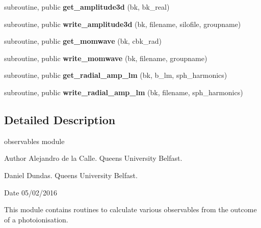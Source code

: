 \begin{DoxyCompactItemize}
\mbox{\label{namespaceobservables_a4898af9bd28d97f07c4bda50b9975368}} 
subroutine, public {\bfseries get\+\_\+amplitude3d} (bk, bk\+\_\+real)
\item 
\mbox{\label{namespaceobservables_a7cf9e4039abeb86fbdcdc0accdb0c5f8}} 
subroutine, public {\bfseries write\+\_\+amplitude3d} (bk, filename, silofile, groupname)
\item 
\mbox{\label{namespaceobservables_a618ee95c37379a52aa20abbabcc0b582}} 
subroutine, public {\bfseries get\+\_\+momwave} (bk, cbk\+\_\+rad)
\item 
\mbox{\label{namespaceobservables_a85e7169aaa65a6e73ae6a1fe1ea80ba5}} 
subroutine, public {\bfseries write\+\_\+momwave} (bk, filename, groupname)
\item 
\mbox{\label{namespaceobservables_ab8ee6f891db9f8aa59cb5aaf38330ce4}} 
subroutine, public {\bfseries get\+\_\+radial\+\_\+amp\+\_\+lm} (bk, b\+\_\+lm, sph\+\_\+harmonics)
\item 
\mbox{\label{namespaceobservables_a01cd97ee60ce8ef98b98e2d245cc3018}} 
subroutine, public {\bfseries write\+\_\+radial\+\_\+amp\+\_\+lm} (bk, filename, sph\+\_\+harmonics)
\end{DoxyCompactItemize}


\subsection{Detailed Description}
observables module 

\begin{DoxyAuthor}{Author}
Alejandro de la Calle. Queen\textquotesingle{}s University Belfast. 

Daniel Dundas. Queen\textquotesingle{}s University Belfast. 
\end{DoxyAuthor}
\begin{DoxyDate}{Date}
05/02/2016
\end{DoxyDate}
This module contains routines to calculate various observables from the outcome of a photoionisation. 